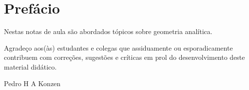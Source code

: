 
\chapter*{Prefácio}\label{prefacio}

Nestas notas de aula são abordados tópicos sobre geometria analítica.

Agradeço aos(às) estudantes e colegas que assiduamente ou esporadicamente contribuem com correções, sugestões e críticas em prol do desenvolvimento deste material didático.

\begin{flushright}
  Pedro H A Konzen
\end{flushright}

